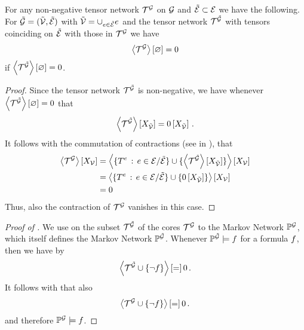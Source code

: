 \begin{lemma}\label{lem:monotocityOfVanishingContractions}
	For any non-negative tensor network $\mathcal{T}^{\mathcal{G}}$ on $\mathcal{G}$ and $\tilde{\mathcal{E}}\subset\mathcal{E}$ we have the following.
	For $\tilde{\mathcal{G}}=(\tilde{\mathcal{V}},\tilde{\mathcal{E}})$ with $\tilde{\mathcal{V}}=\cup_{e\in\tilde{\mathcal{E}}}e$ and the tensor network $\mathcal{T}^{\tilde{\mathcal{G}}}$ with tensors coinciding on $\tilde{\mathcal{E}}$ with those in $\mathcal{T}^{\mathcal{G}}$ we have
	\begin{align*}
		\left\langle \mathcal{T}^{\mathcal{G}}\right\rangle \left[ \varnothing \right] = 0
	\end{align*}
	if $\left\langle \mathcal{T}^{\tilde{\mathcal{G}}}\right\rangle \left[ \varnothing \right]=0$.
\end{lemma}
\begin{proof}
	Since the tensor network $\mathcal{T}^{\tilde{\mathcal{G}}}$ is non-negative, we have whenever $\left\langle \mathcal{T}^{\tilde{\mathcal{G}}}\right\rangle \left[ \varnothing \right]=0$ that
	\begin{align*}
		\left\langle \mathcal{T}^{\tilde{\mathcal{G}}}\right\rangle \left[ X_{\tilde{\mathcal{V}}} \right] = 0\left[X_{\tilde{\mathcal{V}}}\right] \, .
	\end{align*}
	It follows with the commutation of contractions (see  in ), that
	\begin{align*}
		\left\langle \mathcal{T}^{\mathcal{G}}\right\rangle \left[ X_{\mathcal{V}} \right]
		&= \left\langle 
			\{T^{e} \, : \, e\in\mathcal{E}/\tilde{\mathcal{E}}\}
			\cup \{\left\langle \mathcal{T}^{\tilde{\mathcal{G}}}\right\rangle \left[ X_{\tilde{\mathcal{V}}} \right]\}
		\right\rangle \left[ X_{\mathcal{V}} \right] \\
		&= 	\left\langle 
			\{T^{e} \, : \, e\in\mathcal{E}/\tilde{\mathcal{E}}\}
			\cup \{0\left[X_{\tilde{\mathcal{V}}}\right]\}
		\right\rangle \left[ X_{\mathcal{V}} \right] \\
		&= 0
	\end{align*}
	Thus, also the contraction of $\mathcal{T}^{\mathcal{G}}$ vanishes in this case.
\end{proof}

\begin{proof}[Proof of ]
	We use  on the subset $\mathcal{T}^{\tilde{\mathcal{G}}}$ of the cores $\mathcal{T}^{\mathcal{G}}$ to the Markov Network $\mathbb{P}^{\mathcal{G}}$, which itself defines the Markov Network $\mathbb{P}^{\tilde{\mathcal{G}}}$.
	Whenever $\mathbb{P}^{\tilde{\mathcal{G}}}\models f$ for a formula $f$, then we have by 
	\begin{align*}
		\left\langle \mathcal{T}^{\tilde{\mathcal{G}}} \cup\{\lnot f\}\right\rangle \left[ = \right] 0 \, .
	\end{align*}
	It follows with  that also
	\begin{align*}
		\left\langle \mathcal{T}^{\mathcal{G}} \cup\{\lnot f\}\right\rangle \left[ = \right] 0 \, .
	\end{align*}
	and therefore $\mathbb{P}^{\mathcal{G}}\models f$.
\end{proof}


